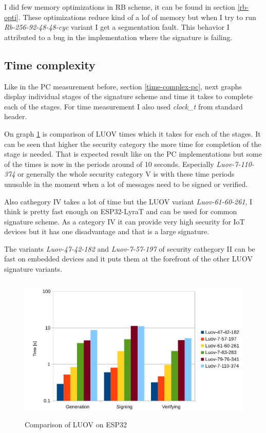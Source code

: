 \documentclass[thesis=M,english]{FITthesis}[2019/12/23]
\begin{document}
\bigskip
\noindent
I did few memory optimizations in RB scheme, it can be found in section \ref{rb-opti}. These optimizations reduce kind of a lof of memory but when I try to run \textit{Rb-256-92-48-48-cyc} variant I get a segmentation fault. This behavior I attributed to a bug in the implementation where the signature is failing. 

\subsection{Time complexity}
Like in the PC measurement before, section \ref{time-complex-pc}, next graphs display individual stages of the signature scheme and time it takes to complete each of the stages. For time measurement I also used \textit{clock\_t} from standard header.

\bigskip
\noindent
On graph \ref{time-luov} is comparison of LUOV times which it takes for each of the stages. It can be seen that higher the security category the more time for completion of the stage is needed. That is expected result like on the PC implementations but some of the times is now in the periods around of 10 seconds. Especially \textit{Luov-7-110-374} or generally the whole security category V is with these time periods unusable in the moment when a lot of messages need to be signed or verified.

\bigskip
\noindent
Also cathegory IV takes a lot of time but the LUOV variant \textit{Luov-61-60-261}, I think is pretty fast enough on ESP32-LyraT and can be used for common signature scheme. As a category IV it can provide very high security for IoT devices but it has one disadvantage and that is a large signature.

\bigskip
\noindent
The variants \textit{Luov-47-42-182} and \textit{Luov-7-57-197} of security cathegory II can be fast on embedded devices and it puts them at the forefront of the other LUOV signature variants.

\bigskip
\begin{figure}[H]
\centering
\includegraphics[width=13cm,height=7cm]{images/time-luov.pdf}
\caption{Comparison of LUOV on ESP32}
\label{time-luov}
\end{figure}
\end{document}
